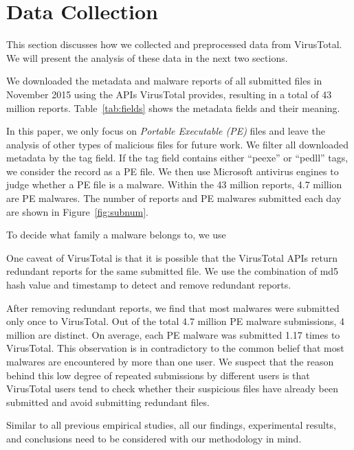 

\section{Data Collection}
\label{sec:meth}

This section discusses how we collected and preprocessed data from VirusTotal.
We will present the analysis of these data in the next two sections.

We downloaded the metadata and malware reports of all submitted files in November 2015 using the APIs VirusTotal provides,
resulting in a total of 43 million reports.
Table~\ref{tab:fields} shows the metadata fields and their meaning. 

In this paper, we only focus on {\em Portable Executable (PE)} files 
and leave the analysis of other types of malicious files for future work. 
We filter all downloaded metadata by the tag field. 
If the tag field contains either ``peexe'' or ``pedll'' tags, we consider the record as a PE file. 
We then use Microsoft antivirus engines to judge whether a PE file is a malware.
Within the 43 million reports, 4.7 million are PE malwares. 
The number of reports and PE malwares submitted each day are shown in Figure~\ref{fig:subnum}.

To decide what family a malware belongs to, we use %

One caveat of VirusTotal is that it is possible that the VirusTotal APIs return redundant reports 
for the same submitted file. 
We use the combination of md5 hash value and timestamp to detect and remove redundant reports.

After removing redundant reports, we find that most malwares were submitted only once to VirusTotal. 
Out of the total 4.7 million PE malware submissions, 4 million are distinct. 
On average, each PE malware was submitted 1.17 times to VirusTotal. 
This observation is in contradictory to the common belief that most malwares are encountered by more than one user.
We suspect that the reason behind this low degree of repeated submissions by different users
is that VirusTotal users
tend to check whether their suspicious files have already been submitted
and avoid submitting redundant files.

Similar to all previous empirical studies, all our findings, experimental results, 
and conclusions need to be considered with our methodology in mind. 

